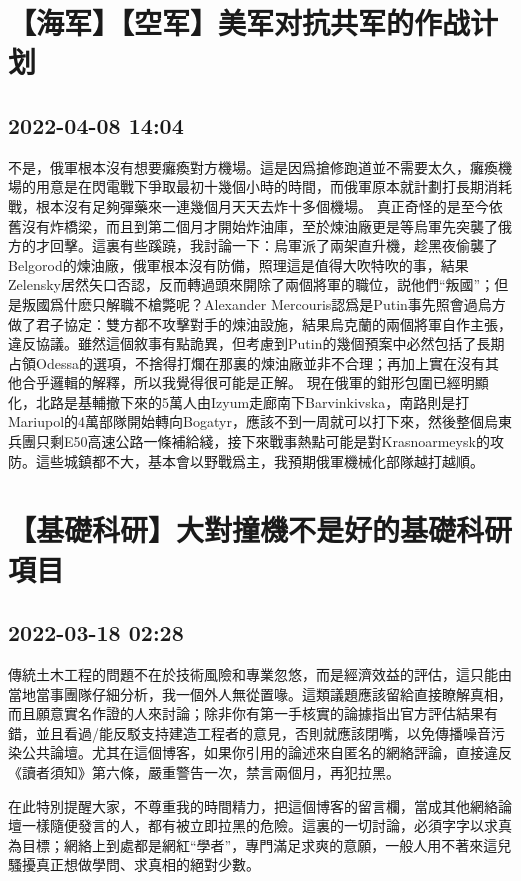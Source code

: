 \documentclass[twocolumn]{ctexart}
\begin{document}
\section*{【海军】【空军】美军对抗共军的作战计划}
\subsection*{2022-04-08 14:04}

不是，俄軍根本沒有想要癱瘓對方機場。這是因爲搶修跑道並不需要太久，癱瘓機場的用意是在閃電戰下爭取最初十幾個小時的時間，而俄軍原本就計劃打長期消耗戰，根本沒有足夠彈藥來一連幾個月天天去炸十多個機場。
真正奇怪的是至今依舊沒有炸橋梁，而且到第二個月才開始炸油庫，至於煉油廠更是等烏軍先突襲了俄方的才回擊。這裏有些蹊蹺，我討論一下：烏軍派了兩架直升機，趁黑夜偷襲了Belgorod的煉油廠，俄軍根本沒有防備，照理這是值得大吹特吹的事，結果Zelensky居然矢口否認，反而轉過頭來開除了兩個將軍的職位，説他們“叛國”；但是叛國爲什麽只解職不槍斃呢？Alexander Mercouris認爲是Putin事先照會過烏方做了君子協定：雙方都不攻擊對手的煉油設施，結果烏克蘭的兩個將軍自作主張，違反協議。雖然這個敘事有點詭異，但考慮到Putin的幾個預案中必然包括了長期占領Odessa的選項，不捨得打爛在那裏的煉油廠並非不合理；再加上實在沒有其他合乎邏輯的解釋，所以我覺得很可能是正解。
現在俄軍的鉗形包圍已經明顯化，北路是基輔撤下來的5萬人由Izyum走廊南下Barvinkivska，南路則是打Mariupol的4萬部隊開始轉向Bogatyr，應該不到一周就可以打下來，然後整個烏東兵團只剩E50高速公路一條補給綫，接下來戰事熱點可能是對Krasnoarmeysk的攻防。這些城鎮都不大，基本會以野戰爲主，我預期俄軍機械化部隊越打越順。
\section*{【基礎科研】大對撞機不是好的基礎科研項目}
\subsection*{2022-03-18 02:28}

傳統土木工程的問題不在於技術風險和專業忽悠，而是經濟效益的評估，這只能由當地當事團隊仔細分析，我一個外人無從置喙。這類議題應該留給直接瞭解真相，而且願意實名作證的人來討論；除非你有第一手核實的論據指出官方評估結果有錯，並且看過/能反駁支持建造工程者的意見，否則就應該閉嘴，以免傳播噪音污染公共論壇。尤其在這個博客，如果你引用的論述來自匿名的網絡評論，直接違反《讀者須知》第六條，嚴重警告一次，禁言兩個月，再犯拉黑。

在此特別提醒大家，不尊重我的時間精力，把這個博客的留言欄，當成其他網絡論壇一樣隨便發言的人，都有被立即拉黑的危險。這裏的一切討論，必須字字以求真為目標；網絡上到處都是網紅“學者”，專門滿足求爽的意願，一般人用不著來這兒騷擾真正想做學問、求真相的絕對少數。
\end{document}
